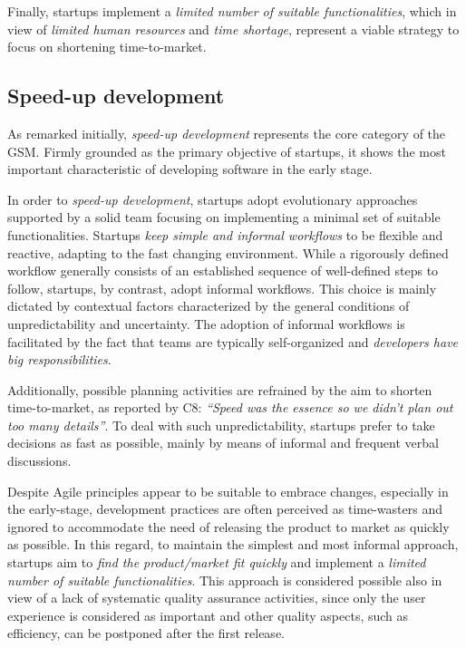 \documentclass[10pt,journal,letterpaper,compsoc]{IEEEtran}
\begin{document}
Finally, startups implement a \textit{limited number of suitable
functionalities}, which in view of \textit{limited human resources} and
\textit{time shortage}, represent a viable strategy to focus on shortening
time-to-market.
\subsection{Speed-up development}\label{res:gsm:cat1} 
As remarked initially, \textit{speed-up development} represents the core 
category of the GSM. Firmly grounded as the primary objective of startups, it 
shows the most important characteristic of developing software in the early 
stage.

In order to \textit{speed-up development}, startups adopt evolutionary 
approaches supported by a solid team focusing on implementing a
minimal set of suitable functionalities. Startups \textit{keep simple and
informal workflows} to be flexible and reactive, adapting to the fast changing
environment. While a rigorously defined workflow generally consists of an
established sequence of well-defined steps to follow, startups, by contrast,
adopt informal workflows. This choice is mainly dictated by contextual factors
characterized by the general conditions of unpredictability and uncertainty. The
adoption of informal workflows is facilitated by the fact that teams are
typically self-organized and \textit{developers have big responsibilities}.

Additionally, possible planning activities are refrained by the aim to shorten
time-to-market, as reported by C8: \textit{``Speed was the essence so we didn't
plan out too many details''}. To deal with such unpredictability, startups
prefer to take decisions as fast as possible, mainly by means of informal and
frequent verbal discussions.

Despite Agile principles appear to be suitable to embrace changes, especially
in the early-stage, development practices are often perceived as time-wasters
and ignored to accommodate the need of releasing the product to market as
quickly as possible. In this regard, to maintain the simplest and most informal
approach, startups aim to \textit{find the product/market fit quickly} and
implement a \textit{limited number of suitable functionalities}. This approach
is considered possible also in view of a lack of systematic quality assurance
activities, since only the user experience is considered as important and other
quality aspects, such as efficiency, can be postponed after the first release.
\end{document}
